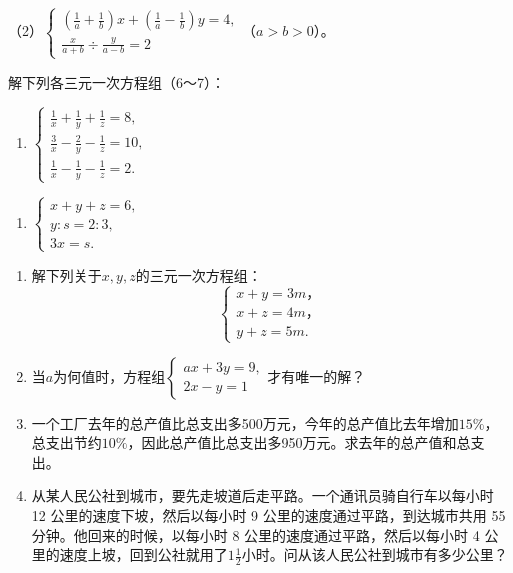 （2）\(\left\{ \begin{array}{l} \left( \frac{1}{a} + \frac{1}{b} \right) x + \left( \frac{1}{a} - \frac{1}{b} \right) y = 4, \\ \frac{x}{a + b} \div \frac{y}{a - b} = 2 \end{array} \right.\)（\(a > b > 0\)）。

解下列各三元一次方程组（6～7）：

\begin{enumerate}[start=7]
\item
  \(\left\{ \begin{array}{l} \frac{1}{x} + \frac{1}{y} + \frac{1}{z} = 8, \\ \frac{3}{x} - \frac{2}{y} - \frac{1}{z} = 10, \\ \frac{1}{x} - \frac{1}{y} - \frac{1}{z} = 2. \end{array} \right.\)
\end{enumerate}

\begin{enumerate}[start=6]
\item
  \(\left\{ \begin{array}{l} x + y + z = 6, \\ y: s = 2: 3, \\ 3x = s. \end{array} \right.\)
\end{enumerate}

\begin{enumerate}[start=8]
\item
  解下列关于\(x, y, z\)的三元一次方程组：
\[
\left\{ \begin{array}{l} x + y = 3 m\text{，} \\ x + z = 4 m\text{，} \\ y + z = 5 m. \end{array} \right.
\]
\item
  当\(a\)为何值时，方程组\(\left\{ \begin{array}{l} ax + 3y = 9, \\ 2x - y = 1 \end{array} \right.\)才有唯一的解？
\item
  一个工厂去年的总产值比总支出多500万元，今年的总产值比去年增加\(15\%\)，总支出节约\(10\%\)，因此总产值比总支出多950万元。求去年的总产值和总支出。
\item
  从某人民公社到城市，要先走坡道后走平路。一个通讯员骑自行车以每小时 12
  公里的速度下坡，然后以每小时 9 公里的速度通过平路，到达城市共用 55
  分钟。他回来的时候，以每小时 8 公里的速度通过平路，然后以每小时 4
  公里的速度上坡，回到公社就用了\(1 \frac{1}{2}\)小时。问从该人民公社到城市有多少公里？
\end{enumerate}

